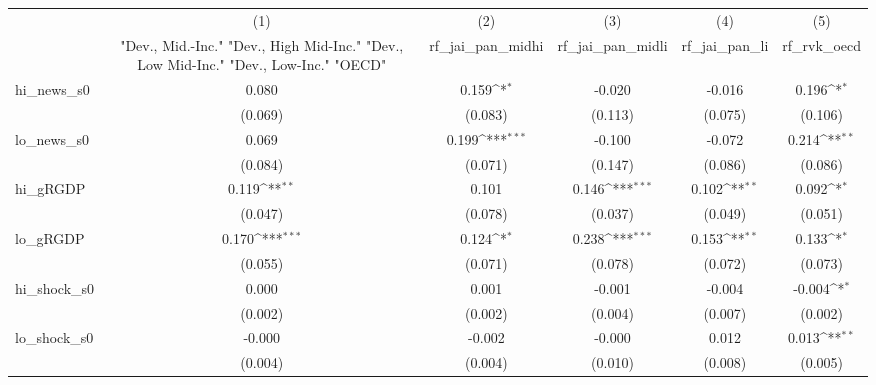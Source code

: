 {
\def\sym#1{\ifmmode^{#1}\else\(^{#1}\)\fi}
\begin{tabular}{l*{5}{c}}
\toprule
            &\multicolumn{1}{c}{(1)}&\multicolumn{1}{c}{(2)}&\multicolumn{1}{c}{(3)}&\multicolumn{1}{c}{(4)}&\multicolumn{1}{c}{(5)}\\
            &\multicolumn{1}{c}{ "Dev., Mid.-Inc." "Dev., High Mid-Inc." "Dev., Low Mid-Inc." "Dev., Low-Inc." "OECD" }&\multicolumn{1}{c}{rf\_jai\_pan\_midhi}&\multicolumn{1}{c}{rf\_jai\_pan\_midli}&\multicolumn{1}{c}{rf\_jai\_pan\_li}&\multicolumn{1}{c}{rf\_rvk\_oecd}\\
\midrule
hi\_news\_s0  &       0.080         &       0.159\sym{*}  &      -0.020         &      -0.016         &       0.196\sym{*}  \\
            &     (0.069)         &     (0.083)         &     (0.113)         &     (0.075)         &     (0.106)         \\
\addlinespace
lo\_news\_s0  &       0.069         &       0.199\sym{***}&      -0.100         &      -0.072         &       0.214\sym{**} \\
            &     (0.084)         &     (0.071)         &     (0.147)         &     (0.086)         &     (0.086)         \\
\addlinespace
hi\_gRGDP    &       0.119\sym{**} &       0.101         &       0.146\sym{***}&       0.102\sym{**} &       0.092\sym{*}  \\
            &     (0.047)         &     (0.078)         &     (0.037)         &     (0.049)         &     (0.051)         \\
\addlinespace
lo\_gRGDP    &       0.170\sym{***}&       0.124\sym{*}  &       0.238\sym{***}&       0.153\sym{**} &       0.133\sym{*}  \\
            &     (0.055)         &     (0.071)         &     (0.078)         &     (0.072)         &     (0.073)         \\
\addlinespace
hi\_shock\_s0 &       0.000         &       0.001         &      -0.001         &      -0.004         &      -0.004\sym{*}  \\
            &     (0.002)         &     (0.002)         &     (0.004)         &     (0.007)         &     (0.002)         \\
\addlinespace
lo\_shock\_s0 &      -0.000         &      -0.002         &      -0.000         &       0.012         &       0.013\sym{**} \\
            &     (0.004)         &     (0.004)         &     (0.010)         &     (0.008)         &     (0.005)         \\

\end{tabular}}
